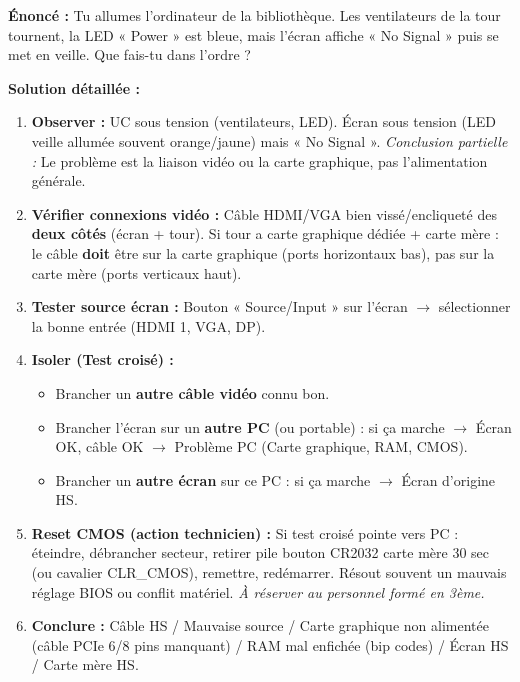 \documentclass[11pt]{article}
\begin{document}
\begin{exoresolu}
\textbf{Énoncé :} Tu allumes l'ordinateur de la bibliothèque. Les ventilateurs de la tour tournent, la LED « Power » est bleue, mais l'écran affiche « No Signal » puis se met en veille. Que fais-tu dans l'ordre ?

\textbf{Solution détaillée :}
\begin{enumerate}
    \item \textbf{Observer :} UC sous tension (ventilateurs, LED). Écran sous tension (LED veille allumée souvent orange/jaune) mais « No Signal ». \emph{Conclusion partielle :} Le problème est la liaison vidéo ou la carte graphique, pas l'alimentation générale.
    \item \textbf{Vérifier connexions vidéo :} Câble HDMI/VGA bien vissé/encliqueté des \textbf{deux côtés} (écran + tour). Si tour a carte graphique dédiée + carte mère : le câble \textbf{doit} être sur la carte graphique (ports horizontaux bas), pas sur la carte mère (ports verticaux haut).
    \item \textbf{Tester source écran :} Bouton « Source/Input » sur l'écran $\rightarrow$ sélectionner la bonne entrée (HDMI 1, VGA, DP).
    \item \textbf{Isoler (Test croisé) :}
        \begin{itemize}
            \item Brancher un \textbf{autre câble vidéo} connu bon.
            \item Brancher l'écran sur un \textbf{autre PC} (ou portable) : si ça marche $\rightarrow$ Écran OK, câble OK $\rightarrow$ Problème PC (Carte graphique, RAM, CMOS).
            \item Brancher un \textbf{autre écran} sur ce PC : si ça marche $\rightarrow$ Écran d'origine HS.
        \end{itemize}
    \item \textbf{Reset CMOS (action technicien) :} Si test croisé pointe vers PC : éteindre, débrancher secteur, retirer pile bouton CR2032 carte mère 30 sec (ou cavalier CLR\_CMOS), remettre, redémarrer. Résout souvent un mauvais réglage BIOS ou conflit matériel. \emph{À réserver au personnel formé en 3ème.}
    \item \textbf{Conclure :} Câble HS / Mauvaise source / Carte graphique non alimentée (câble PCIe 6/8 pins manquant) / RAM mal enfichée (bip codes) / Écran HS / Carte mère HS.
\end{enumerate}
\end{exoresolu}
\end{document}
